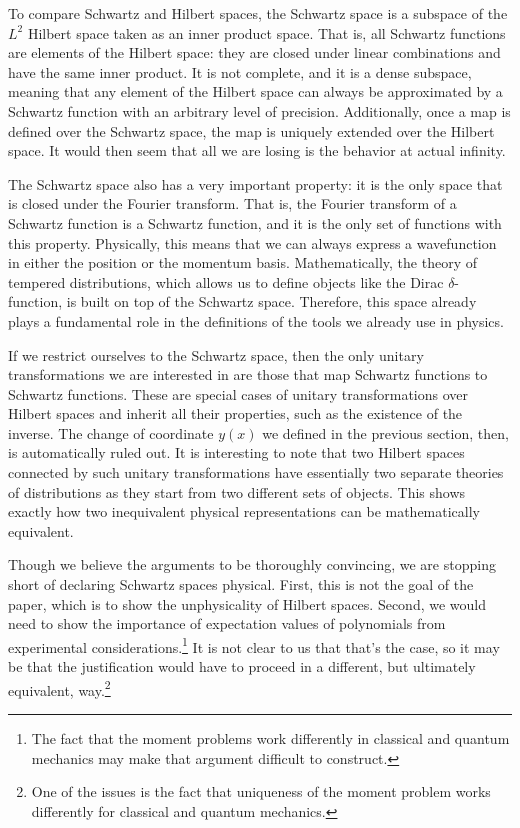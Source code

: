 \documentclass[10pt,twocolumn, nofootinbib]{revtex4-2}
\begin{document}
To compare Schwartz and Hilbert spaces, the Schwartz space is a subspace of the $L^2$ Hilbert space taken as an inner product space. That is, all Schwartz functions are elements of the Hilbert space: they are closed under linear combinations and have the same inner product. It is not complete, and it is a dense subspace, meaning that any element of the Hilbert space can always be approximated by a Schwartz function with an arbitrary level of precision. Additionally, once a map is defined over the Schwartz space, the map is uniquely extended over the Hilbert space. It would then seem that all we are losing is the behavior at actual infinity.

The Schwartz space also has a very important property: it is the only space that is closed under the Fourier transform. That is, the Fourier transform of a Schwartz function is a Schwartz function, and it is the only set of functions with this property. Physically, this means that we can always express a wavefunction in either the position or the momentum basis. Mathematically, the theory of tempered distributions, which allows us to define objects like the Dirac $\delta$-function, is built on top of the Schwartz space. Therefore, this space already plays a fundamental role in the definitions of the tools we already use in physics.

If we restrict ourselves to the Schwartz space, then the only unitary transformations we are interested in are those that map Schwartz functions to Schwartz functions. These are special cases of unitary transformations over Hilbert spaces and inherit all their properties, such as the existence of the inverse. The change of coordinate $y(x)$ we defined in the previous section, then, is automatically ruled out. It is interesting to note that two Hilbert spaces connected by such unitary transformations have essentially two separate theories of distributions as they start from two different sets of objects. This shows exactly how two inequivalent physical representations can be mathematically equivalent.

Though we believe the arguments to be thoroughly convincing, we are stopping short of declaring Schwartz spaces physical. First, this is not the goal of the paper, which is to show the unphysicality of Hilbert spaces. Second, we would need to show the importance of expectation values of polynomials from experimental considerations.\footnote{The fact that the moment problems work differently in classical and quantum mechanics may make that argument difficult to construct.} It is not clear to us that that's the case, so it may be that the justification would have to proceed in a different, but ultimately equivalent, way.\footnote{One of the issues is the fact that uniqueness of the moment problem works differently for classical and quantum mechanics.}
\end{document}
